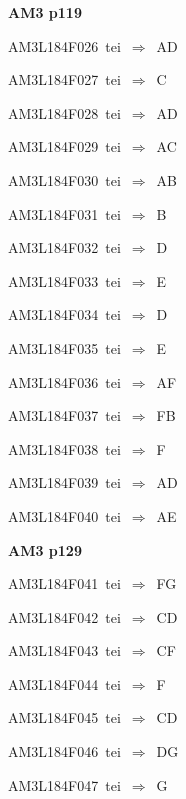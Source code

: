 \par\vfill\eject
{\bf\hfill AM3 p119\hfill\hbox{}}\par\bigskip
{\sixrm AM3L184F026\ {\sixit tei}\ }$\Rightarrow$\ AD\par\smallskip
{\sixrm AM3L184F027\ {\sixit tei}\ }$\Rightarrow$\ C\par\smallskip
{\sixrm AM3L184F028\ {\sixit tei}\ }$\Rightarrow$\ AD\par\smallskip
{\sixrm AM3L184F029\ {\sixit tei}\ }$\Rightarrow$\ AC\par\smallskip
{\sixrm AM3L184F030\ {\sixit tei}\ }$\Rightarrow$\ AB\par\smallskip
{\sixrm AM3L184F031\ {\sixit tei}\ }$\Rightarrow$\ B\par\smallskip
{\sixrm AM3L184F032\ {\sixit tei}\ }$\Rightarrow$\ D\par\smallskip
{\sixrm AM3L184F033\ {\sixit tei}\ }$\Rightarrow$\ E\par\smallskip
{\sixrm AM3L184F034\ {\sixit tei}\ }$\Rightarrow$\ D\par\smallskip
{\sixrm AM3L184F035\ {\sixit tei}\ }$\Rightarrow$\ E\par\smallskip
{\sixrm AM3L184F036\ {\sixit tei}\ }$\Rightarrow$\ AF\par\smallskip
{\sixrm AM3L184F037\ {\sixit tei}\ }$\Rightarrow$\ FB\par\smallskip
{\sixrm AM3L184F038\ {\sixit tei}\ }$\Rightarrow$\ F\par\smallskip
{\sixrm AM3L184F039\ {\sixit tei}\ }$\Rightarrow$\ AD\par\smallskip
{\sixrm AM3L184F040\ {\sixit tei}\ }$\Rightarrow$\ AE\par\smallskip

\par\vfill\eject
{\bf\hfill AM3 p129\hfill\hbox{}}\par\bigskip
{\sixrm AM3L184F041\ {\sixit tei}\ }$\Rightarrow$\ FG\par\smallskip
{\sixrm AM3L184F042\ {\sixit tei}\ }$\Rightarrow$\ CD\par\smallskip
{\sixrm AM3L184F043\ {\sixit tei}\ }$\Rightarrow$\ CF\par\smallskip
{\sixrm AM3L184F044\ {\sixit tei}\ }$\Rightarrow$\ F\par\smallskip
{\sixrm AM3L184F045\ {\sixit tei}\ }$\Rightarrow$\ CD\par\smallskip
{\sixrm AM3L184F046\ {\sixit tei}\ }$\Rightarrow$\ DG\par\smallskip
{\sixrm AM3L184F047\ {\sixit tei}\ }$\Rightarrow$\ G\par\smallskip

